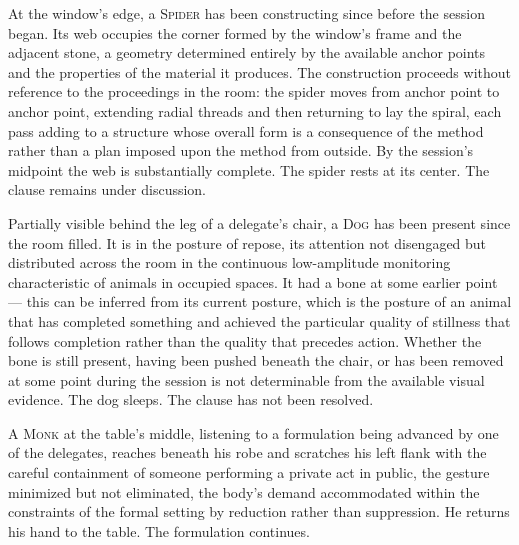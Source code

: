 \documentclass[12pt, oneside]{article}
\newenvironment{action}{%
  \vspace{0.6em}%
  \noindent\ignorespaces%
}{%
  \par\vspace{0.6em}%
}
\begin{document}
\begin{action}
At the window's edge, a \textsc{Spider} has been constructing since before the session began. Its web occupies the corner formed by the window's frame and the adjacent stone, a geometry determined entirely by the available anchor points and the properties of the material it produces. The construction proceeds without reference to the proceedings in the room: the spider moves from anchor point to anchor point, extending radial threads and then returning to lay the spiral, each pass adding to a structure whose overall form is a consequence of the method rather than a plan imposed upon the method from outside. By the session's midpoint the web is substantially complete. The spider rests at its center. The clause remains under discussion.

Partially visible behind the leg of a delegate's chair, a \textsc{Dog} has been present since the room filled. It is in the posture of repose, its attention not disengaged but distributed across the room in the continuous low-amplitude monitoring characteristic of animals in occupied spaces. It had a bone at some earlier point --- this can be inferred from its current posture, which is the posture of an animal that has completed something and achieved the particular quality of stillness that follows completion rather than the quality that precedes action. Whether the bone is still present, having been pushed beneath the chair, or has been removed at some point during the session is not determinable from the available visual evidence. The dog sleeps. The clause has not been resolved.

A \textsc{Monk} at the table's middle, listening to a formulation being advanced by one of the delegates, reaches beneath his robe and scratches his left flank with the careful containment of someone performing a private act in public, the gesture minimized but not eliminated, the body's demand accommodated within the constraints of the formal setting by reduction rather than suppression. He returns his hand to the table. The formulation continues.
\end{action}
\end{document}
